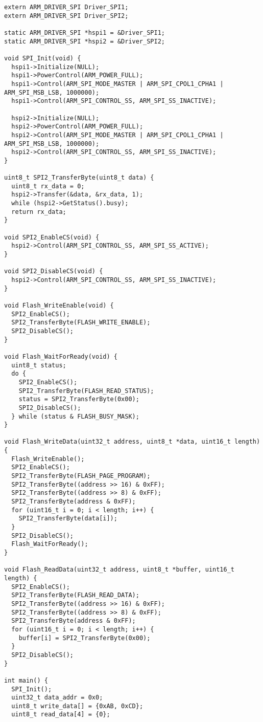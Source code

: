 \documentclass[oneside,14pt]{extarticle}
\begin{document}
\begin{normalsize}
{\begin{lstlisting}
extern ARM_DRIVER_SPI Driver_SPI1;
extern ARM_DRIVER_SPI Driver_SPI2;

static ARM_DRIVER_SPI *hspi1 = &Driver_SPI1;
static ARM_DRIVER_SPI *hspi2 = &Driver_SPI2;

void SPI_Init(void) {
  hspi1->Initialize(NULL);
  hspi1->PowerControl(ARM_POWER_FULL);
  hspi1->Control(ARM_SPI_MODE_MASTER | ARM_SPI_CPOL1_CPHA1 | ARM_SPI_MSB_LSB, 1000000);
  hspi1->Control(ARM_SPI_CONTROL_SS, ARM_SPI_SS_INACTIVE);

  hspi2->Initialize(NULL);
  hspi2->PowerControl(ARM_POWER_FULL);
  hspi2->Control(ARM_SPI_MODE_MASTER | ARM_SPI_CPOL1_CPHA1 | ARM_SPI_MSB_LSB, 1000000);
  hspi2->Control(ARM_SPI_CONTROL_SS, ARM_SPI_SS_INACTIVE);
}

uint8_t SPI2_TransferByte(uint8_t data) {
  uint8_t rx_data = 0;
  hspi2->Transfer(&data, &rx_data, 1);
  while (hspi2->GetStatus().busy);
  return rx_data;
}

void SPI2_EnableCS(void) {
  hspi2->Control(ARM_SPI_CONTROL_SS, ARM_SPI_SS_ACTIVE);
}

void SPI2_DisableCS(void) {
  hspi2->Control(ARM_SPI_CONTROL_SS, ARM_SPI_SS_INACTIVE);
}

void Flash_WriteEnable(void) {
  SPI2_EnableCS();
  SPI2_TransferByte(FLASH_WRITE_ENABLE);
  SPI2_DisableCS();
}

void Flash_WaitForReady(void) {
  uint8_t status;
  do {
    SPI2_EnableCS();
    SPI2_TransferByte(FLASH_READ_STATUS);
    status = SPI2_TransferByte(0x00);
    SPI2_DisableCS();
  } while (status & FLASH_BUSY_MASK);
}

void Flash_WriteData(uint32_t address, uint8_t *data, uint16_t length) {
  Flash_WriteEnable();
  SPI2_EnableCS();
  SPI2_TransferByte(FLASH_PAGE_PROGRAM);
  SPI2_TransferByte((address >> 16) & 0xFF);
  SPI2_TransferByte((address >> 8) & 0xFF);
  SPI2_TransferByte(address & 0xFF);
  for (uint16_t i = 0; i < length; i++) {
    SPI2_TransferByte(data[i]);
  }
  SPI2_DisableCS();
  Flash_WaitForReady();
}

void Flash_ReadData(uint32_t address, uint8_t *buffer, uint16_t length) {
  SPI2_EnableCS();
  SPI2_TransferByte(FLASH_READ_DATA);
  SPI2_TransferByte((address >> 16) & 0xFF);
  SPI2_TransferByte((address >> 8) & 0xFF);
  SPI2_TransferByte(address & 0xFF);
  for (uint16_t i = 0; i < length; i++) {
    buffer[i] = SPI2_TransferByte(0x00);
  }
  SPI2_DisableCS();
}

int main() {
  SPI_Init();
  uint32_t data_addr = 0x0;
  uint8_t write_data[] = {0xAB, 0xCD};
  uint8_t read_data[4] = {0};


\end{lstlisting}}
\end{normalsize}
\end{document}

